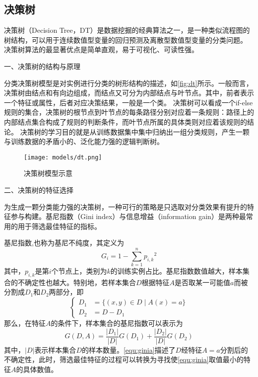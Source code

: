 \subsection{决策树}
决策树（Decision Tree，DT）是数据挖掘的经典算法之一，是一种类似流程图的树结构，可以用于连续数值型变量的回归预测及离散型数值型变量的分类问题\cite{Li2017,Liu2018}。
决策树算法的最显著优点是简单直观，易于可视化、可读性强。

一、决策树的结构与原理

分类决策树模型是对实例进行分类的树形结构的描述，如\autoref{fig:dt}所示。一般而言，决策树由结点和有向边组成，而结点又可分为内部结点与叶节点。其中，前者表示一个特征或属性，后者对应决策结果，一般是一个类\cite{Li2017,Zhou2016}。
决策树可以看成一个if-else规则的集合，决策树的根节点到叶节点的每条路径分别对应着一条规则：路径上的内部结点集合构成了规则的判断条件，而叶节点所属的具体类则对应着该规则的结论。
决策树的学习目的就是从训练数据集中集中归纳出一组分类规则，产生一颗与训练数据的矛盾小的、泛化能力强的逻辑判断树。
\begin{figure}[htbp]
    \centering
    \texttt{[image: models/dt.png]}
    \caption{\label{fig:dt}决策树模型示意}
\end{figure}

二、决策树的特征选择

为生成一颗分类能力强的决策树，一种可行的策略是只选取对分类效果有提升的特征参与构建。基尼指数（Gini index）与信息增益（information gain）是两种最常用的用于筛选最佳特征的指标。

基尼指数,也称为基尼不纯度，其定义为
\begin{equation}
    \label{equ:gini}
    G_i = 1 - \sum_{k=1}^n{p_{i,k}}^2
\end{equation}
其中，$p_{i,k}$是第$i$个节点上，类别为$k$的训练实例占比。基尼指数数值越大，样本集合的不确定性也越大。特别地，若样本集合$D$根据特征$A$是否取某一可能值$a$而被分割成$D_1$和$D_2$两部分，即
\begin{equation}
    \label{equ:daset}
    \left \{
    \begin{aligned}
        D_1 &= \{ (x,y) \in D \mid A(x) = a\} \\
        D_2 &= D - D_1
    \end{aligned}
    \right.
\end{equation}
那么，在特征$A$的条件下，样本集合的基尼指数可以表示为
\begin{equation}
    \label{equ:ginia}
    G(D,A) = \frac{|D_1|}{|D|}G(D_1) + \frac{|D_2|}{|D|}G(D_2)
\end{equation}
其中，$|D|$表示样本集合$D$的样本数量。\autoref{equ:ginia}描述了$D$经特征$A=a$分割后的不确定性，此时，筛选最佳特征的过程可以转换为寻找使\autoref{equ:ginia}取值最小的特征$A$的具体数值。

